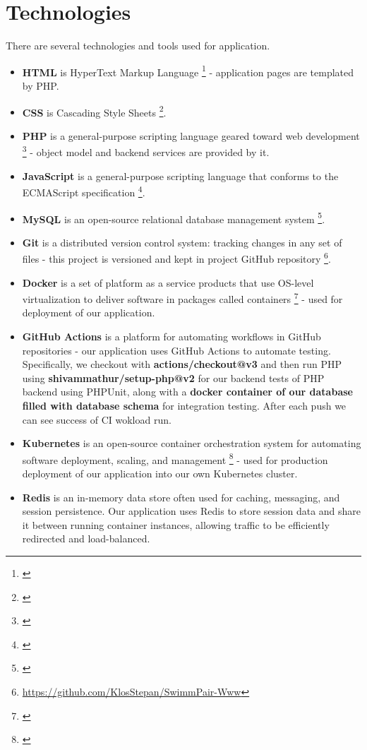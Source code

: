 \section{Technologies}
There are several technologies and tools used for application.
\begin{itemize}
    \item \textbf{HTML} is HyperText Markup Language \footnote{\citep{HTML5Standard}} - application pages are templated by PHP.
    \item \textbf{CSS} is Cascading Style Sheets \footnote{\citep{CSS3Standard}}.
    \item \textbf{PHP} is a general-purpose scripting language geared toward web development \footnote{\citep{PHP74Standard}} - object model and backend services are provided by it.
    \item \textbf{JavaScript}  is a general-purpose scripting language that conforms to the ECMAScript specification \footnote{\citep{ECMADocu}}.
    \item \textbf{MySQL} is an open-source relational database management system \footnote{\citep{MySQLDocu}}.
    \item \textbf{Git} is a distributed version control system: tracking changes in any set of files - this project is versioned and kept in project GitHub repository \footnote{\url{https://github.com/KlosStepan/SwimmPair-Www}}.
    \item \textbf{Docker} is a set of platform as a service products that use OS-level virtualization to deliver software in packages called containers \footnote{\citep{DockerDocu}} - used for deployment of our application.
    \item \textbf{GitHub Actions} is a platform for automating workflows in GitHub repositories - our application uses GitHub Actions to automate testing. Specifically, we checkout with \textbf{actions/checkout@v3} and then run PHP using \textbf{shivammathur/setup-php@v2} for our backend tests of PHP backend using PHPUnit, along with a \textbf{docker container of our database filled with database schema} for integration testing. After each push we can see success of CI wokload run.
    \item \textbf{Kubernetes} is an open-source container orchestration system for automating software deployment, scaling, and management \footnote{\citep{K8sDocu}} - used for production deployment of our application into our own Kubernetes cluster.
    \item \textbf{Redis} is an in-memory data store often used for caching, messaging, and session persistence. Our application uses Redis to store session data and share it between running container instances, allowing traffic to be efficiently redirected and load-balanced.
\end{itemize} 
\newpage
